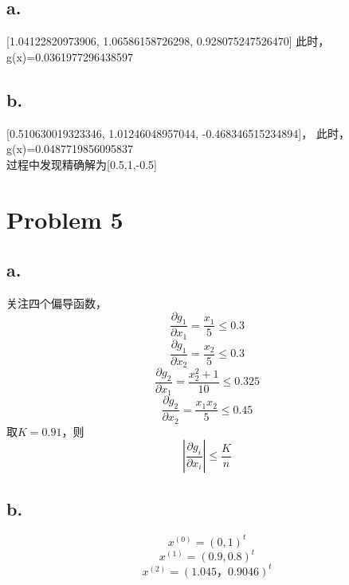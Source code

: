 \documentclass{article}
\begin{document}
\subsection{a.}
[1.04122820973906, 1.06586158726298, 0.928075247526470]
此时，g(x)=0.0361977296438597
\subsection{b.}
[0.510630019323346, 1.01246048957044, -0.468346515234894]，
此时，g(x)=0.0487719856095837\\

过程中发现精确解为[0.5,1,-0.5]
\section{Problem 5}
\subsection{a.}
关注四个偏导函数，
$$\frac{ \partial g_1 }{ \partial x_1 }=\frac{x_1}{5}\leq0.3$$
$$\frac{ \partial g_1 }{ \partial x_2 }=\frac{x_2}{5}\leq0.3$$
$$\frac{ \partial g_2 }{ \partial x_1 }=\frac{x_2^2 +1}{10}\leq0.325$$
$$\frac{ \partial g_2 }{ \partial x_2 }=\frac{x_1 x_2}{5}\leq0.45$$
取$K=0.91$，则$$|\frac{ \partial g_i }{ \partial x_i }|\leq \frac{K}{n}$$

\subsection{b.}
$$x^{(0)}=(0,1)^t$$
$$x^{(1)}=(0.9,0.8)^t$$
$$x^{(2)}=(1.045，0.9046)^t$$
\end{document}
